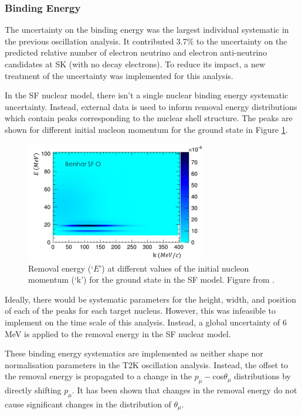 \subsubsection{Binding Energy}\label{sec:eb}

The uncertainty on the binding energy was the largest individual systematic in the previous oscillation analysis. It contributed 3.7$\%$ to the uncertainty on the predicted relative number of electron neutrino and electron anti-neutrino candidates at SK (with no decay electrons)\cite{t2knature}. To reduce its impact, a new treatment of the uncertainty was implemented for this analysis.

In the SF nuclear model, there isn't a single nuclear binding energy systematic uncertainty. Instead, external data is used to inform removal energy distributions which contain peaks corresponding to the nuclear shell structure. The peaks are shown for different initial nucleon momentum for the ground state in Figure \ref{fig:sfshells}.

\begin{figure}[!htbp]
\centering
\includegraphics*[width=0.7\textwidth,clip]{figs/SFShells}
\caption{Removal energy (`$E$') at different values of the initial nucleon momentum (`k') for the ground state in the SF model. Figure from \cite{tn344}.}\label{fig:sfshells}
\end{figure}

Ideally, there would be systematic parameters for the height, width, and position of each of the peaks for each target nucleus. However, this was infeasible to implement on the time scale of this analysis. Instead, a global uncertainty of 6 MeV is applied to the removal energy in the SF nuclear model.

These binding energy systematics are implemented as neither shape nor normalisation parameters in the T2K oscillation analysis. Instead, the offset to the removal energy is propagated to a change in the $p_{\mu}-$cos$\theta_{\mu}$ distributions by directly shifting $p_{\mu}$. It has been shown that changes in the removal energy do not cause significant changes in the distribution of $\theta_{\mu}$.

